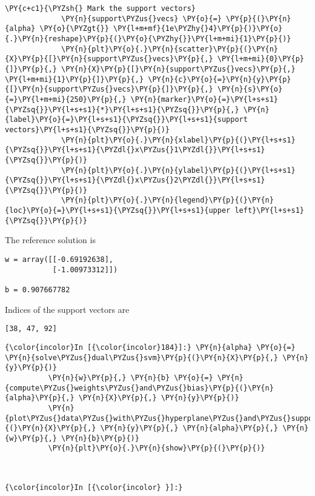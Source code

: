 \begin{Verbatim}[commandchars=\\\{\}]
             \PY{c+c1}{\PYZsh{} Mark the support vectors}
             \PY{n}{support\PYZus{}vecs} \PY{o}{=} \PY{p}{(}\PY{n}{alpha} \PY{o}{\PYZgt{}} \PY{l+m+mf}{1e\PYZhy{}4}\PY{p}{)}\PY{o}{.}\PY{n}{reshape}\PY{p}{(}\PY{o}{\PYZhy{}}\PY{l+m+mi}{1}\PY{p}{)}
             \PY{n}{plt}\PY{o}{.}\PY{n}{scatter}\PY{p}{(}\PY{n}{X}\PY{p}{[}\PY{n}{support\PYZus{}vecs}\PY{p}{,} \PY{l+m+mi}{0}\PY{p}{]}\PY{p}{,} \PY{n}{X}\PY{p}{[}\PY{n}{support\PYZus{}vecs}\PY{p}{,} \PY{l+m+mi}{1}\PY{p}{]}\PY{p}{,} \PY{n}{c}\PY{o}{=}\PY{n}{y}\PY{p}{[}\PY{n}{support\PYZus{}vecs}\PY{p}{]}\PY{p}{,} \PY{n}{s}\PY{o}{=}\PY{l+m+mi}{250}\PY{p}{,} \PY{n}{marker}\PY{o}{=}\PY{l+s+s1}{\PYZsq{}}\PY{l+s+s1}{*}\PY{l+s+s1}{\PYZsq{}}\PY{p}{,} \PY{n}{label}\PY{o}{=}\PY{l+s+s1}{\PYZsq{}}\PY{l+s+s1}{support vectors}\PY{l+s+s1}{\PYZsq{}}\PY{p}{)}
             \PY{n}{plt}\PY{o}{.}\PY{n}{xlabel}\PY{p}{(}\PY{l+s+s1}{\PYZsq{}}\PY{l+s+s1}{\PYZdl{}x\PYZus{}1\PYZdl{}}\PY{l+s+s1}{\PYZsq{}}\PY{p}{)}
             \PY{n}{plt}\PY{o}{.}\PY{n}{ylabel}\PY{p}{(}\PY{l+s+s1}{\PYZsq{}}\PY{l+s+s1}{\PYZdl{}x\PYZus{}2\PYZdl{}}\PY{l+s+s1}{\PYZsq{}}\PY{p}{)}
             \PY{n}{plt}\PY{o}{.}\PY{n}{legend}\PY{p}{(}\PY{n}{loc}\PY{o}{=}\PY{l+s+s1}{\PYZsq{}}\PY{l+s+s1}{upper left}\PY{l+s+s1}{\PYZsq{}}\PY{p}{)}
\end{Verbatim}

    The reference solution is

\begin{verbatim}
w = array([[-0.69192638],
           [-1.00973312]])

b = 0.907667782
\end{verbatim}

Indices of the support vectors are

\begin{verbatim}
[38, 47, 92]
\end{verbatim}

    \begin{Verbatim}[commandchars=\\\{\}]
{\color{incolor}In [{\color{incolor}184}]:} \PY{n}{alpha} \PY{o}{=} \PY{n}{solve\PYZus{}dual\PYZus{}svm}\PY{p}{(}\PY{n}{X}\PY{p}{,} \PY{n}{y}\PY{p}{)}
          \PY{n}{w}\PY{p}{,} \PY{n}{b} \PY{o}{=} \PY{n}{compute\PYZus{}weights\PYZus{}and\PYZus{}bias}\PY{p}{(}\PY{n}{alpha}\PY{p}{,} \PY{n}{X}\PY{p}{,} \PY{n}{y}\PY{p}{)}
          \PY{n}{plot\PYZus{}data\PYZus{}with\PYZus{}hyperplane\PYZus{}and\PYZus{}support\PYZus{}vectors}\PY{p}{(}\PY{n}{X}\PY{p}{,} \PY{n}{y}\PY{p}{,} \PY{n}{alpha}\PY{p}{,} \PY{n}{w}\PY{p}{,} \PY{n}{b}\PY{p}{)}
          \PY{n}{plt}\PY{o}{.}\PY{n}{show}\PY{p}{(}\PY{p}{)}
\end{Verbatim}

    \begin{center}
    \end{center}
    { \hspace*{\fill} \\}
    
    \begin{Verbatim}[commandchars=\\\{\}]
{\color{incolor}In [{\color{incolor} }]:} 
\end{Verbatim}
